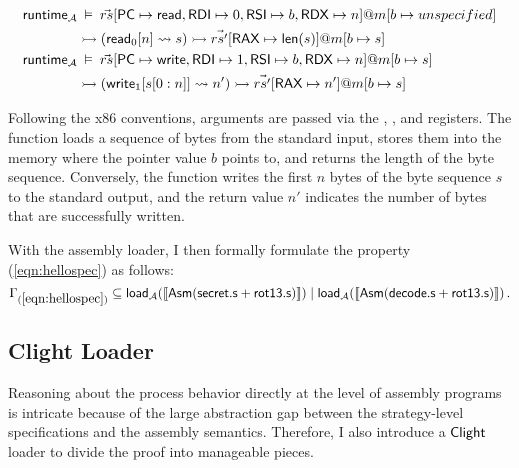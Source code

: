 {\footnotesize
  \begin{align*}
     \mathsf{runtime} _\mathcal{A} & \:\vDash\:
    \vec{rs}[ \mathsf{PC}  \mapsto  \mathsf{read} ,
       \mathsf{RDI}  \mapsto 0,
       \mathsf{RSI}  \mapsto b,
     \mathsf{RDX}  \mapsto n]@m[b \mapsto unspecified] \\
    & \rightarrowtail ( \mathsf{read} _0[n] \leadsto s)
    \rightarrowtail \vec{rs'}[ \mathsf{RAX}  \mapsto  \mathsf{len} (s)]@m[b \mapsto s] \\
     \mathsf{runtime} _\mathcal{A} & \:\vDash\:
    \vec{rs}[ \mathsf{PC}  \mapsto  \mathsf{write} ,
       \mathsf{RDI}  \mapsto 1,
       \mathsf{RSI}  \mapsto b,
     \mathsf{RDX}  \mapsto n]@m[b \mapsto s] \\
    &  \rightarrowtail
    ( \mathsf{write} _1[s[0:n]] \leadsto n')
    \rightarrowtail \vec{rs'}[ \mathsf{RAX}  \mapsto n']@m[b \mapsto s]
  \end{align*}
}

Following the x86 conventions,
arguments are passed via
the , , and  registers.
The  function
loads a sequence of bytes
from the standard input,
stores them into the memory
where the pointer value $b$ points to,
and returns the length of the byte sequence.
Conversely, the  function
writes the first $n$ bytes
of the byte sequence $s$
to the standard output,
and the return value $n'$ indicates
the number of bytes that are successfully written.

With the assembly loader,
I then formally formulate the property (\ref{eqn:hellospec})
as follows:
\[
  \Gamma_{ \mathsf{(\ref{eqn:hellospec})} } \subseteq
   \mathsf{load} _\mathcal{A}(\llbracket  \mathsf{Asm} ( \mathsf{secret.s}  +  \mathsf{rot13.s} ) \rrbracket)
  \mid
   \mathsf{load} _\mathcal{A}(\llbracket  \mathsf{Asm} ( \mathsf{decode.s}  +  \mathsf{rot13.s} ) \rrbracket)
  \,.
\]

\subsection{Clight Loader}

Reasoning about the process behavior
directly at the level of assembly programs
is intricate because of
the large abstraction gap between
the strategy-level specifications
and the assembly semantics.
Therefore,
I also introduce a $ \mathsf{Clight} $ loader
to divide the proof
into manageable pieces.

